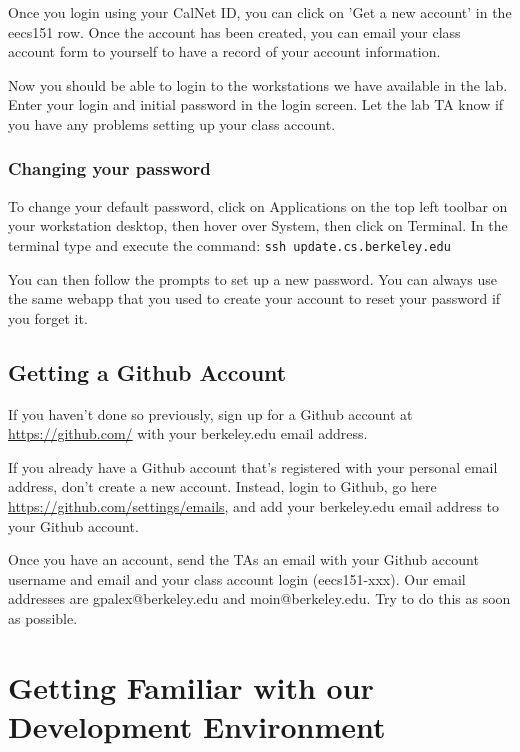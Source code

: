 \documentclass[11pt]{article}
\begin{document}
Once you login using your CalNet ID, you can click on 'Get a new account' in the eecs151 row. Once the account has been created, you can email your class account form to yourself to have a record of your account information.

Now you should be able to login to the workstations we have available in the lab. Enter your login and initial password in the login screen. Let the lab TA know if you have any problems setting up your class account.

\subsubsection{Changing your password}
To change your default password, click on Applications on the top left toolbar on your workstation desktop, then hover over System, then click on Terminal. In the terminal type and execute the command: \verb|ssh update.cs.berkeley.edu|

You can then follow the prompts to set up a new password. You can always use the same webapp that you used to create your account to reset your password if you forget it.

\subsection{Getting a Github Account}
If you haven't done so previously, sign up for a Github account at \url{https://github.com/} with your berkeley.edu email address.

If you already have a Github account that's registered with your personal email address, don't create a new account. Instead, login to Github, go here \url{https://github.com/settings/emails}, and add your berkeley.edu email address to your Github account.

Once you have an account, send the TAs an email with your Github account username and email and your class account login (eecs151-xxx). Our email addresses are gpalex@berkeley.edu and moin@berkeley.edu. Try to do this as soon as possible.


\section{Getting Familiar with our Development Environment}
\end{document}
